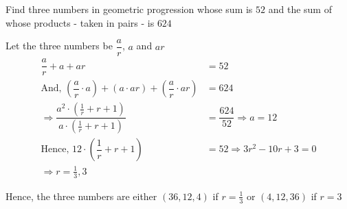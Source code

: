 
%
%
%
%
% 
% 

\question Find three numbers in geometric progression whose sum is $52$ and the
sum of whose products - taken in pairs - is $624$

\insertQR{}

\ifprintanswers
\fi 

\begin{solution}
	Let the three numbers be $\dfrac{a}{r}$, $a$ and $ar$
	\begin{align}
		\dfrac{a}{r} + a + ar &= 52 \\
		\text{And, } \left( \dfrac{a}{r}\cdot a\right) + \left( a\cdot ar\right) + 
		\left( \dfrac{a}{r}\cdot ar\right) &= 624 \\
		\Rightarrow \dfrac{a^2\cdot\left( \frac{1}{r} + r + 1 \right)}{a\cdot\left( \frac{1}{r} + r + 1\right)}
		&= \dfrac{624}{52} \Rightarrow a = 12 \\
		\text{Hence, } 12\cdot\left( \dfrac{1}{r} + r + 1 \right) &= 52 \Rightarrow 3r^2-10r + 3 = 0 \\
		\Rightarrow r = \frac{1}{3}, 3
	\end{align}
	
	Hence, the three numbers are either $(36,12,4)$ if $r=\frac{1}{3}$ or $(4,12,36)$ if $r=3$
\end{solution}

